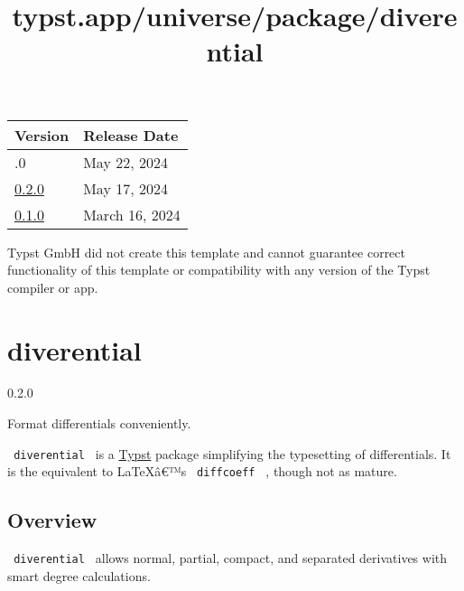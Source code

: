 \begin{longtable}[]{@{}ll@{}}
\toprule\noalign{}
Version & Release Date \\
\midrule\noalign{}
\endhead
\bottomrule\noalign{}
\endlastfoot
0.3.0 & May 22, 2024 \\
\href{https://typst.app/universe/package/delegis/0.2.0/}{0.2.0} & May
17, 2024 \\
\href{https://typst.app/universe/package/delegis/0.1.0/}{0.1.0} & March
16, 2024 \\
\end{longtable}

Typst GmbH did not create this template and cannot guarantee correct
functionality of this template or compatibility with any version of the
Typst compiler or app.


\title{typst.app/universe/package/diverential}

\label{banner}
\section{diverential}\label{diverential}

{ 0.2.0 }

Format differentials conveniently.

\label{readme}
\texttt{\ diverential\ } is a
\href{https://github.com/typst/typst}{Typst} package simplifying the
typesetting of differentials. It is the equivalent to LaTeXâ€™s
\texttt{\ diffcoeff\ } , though not as mature.

\subsection{Overview}\label{overview}

\texttt{\ diverential\ } allows normal, partial, compact, and separated
derivatives with smart degree calculations.

\begin{Shaded}
\begin{Highlighting}[]
\NormalTok{\#} \OperatorTok{:} \OperatorTok{*}

\NormalTok{$ }\OperatorTok{,}\OperatorTok{,}\OperatorTok{:} \OperatorTok{,}\OperatorTok{:} \NormalTok{) $}
\NormalTok{$ }\OperatorTok{,}\OperatorTok{,}\OperatorTok{,}\OperatorTok{:} \OperatorTok{,}\OperatorTok{:} \StringTok{"["}\NormalTok{) $}
\NormalTok{$ }\OperatorTok{,}
\NormalTok{$ }\OperatorTok{,}\NormalTok{ \#([x]}\OperatorTok{,} \NormalTok{)}\OperatorTok{,}\NormalTok{ \#([y]}\OperatorTok{,}\NormalTok{ [n])}\OperatorTok{,}\NormalTok{ \#([z]}\OperatorTok{,}\NormalTok{ [m])}\OperatorTok{,}\OperatorTok{:} \NormalTok{) $}
\end{Highlighting}
\end{Shaded}

